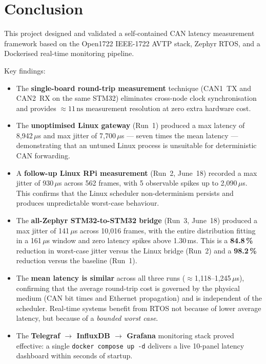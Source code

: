 \documentclass[11pt,a4paper]{article}
\begin{document}
\section{Conclusion}
\label{sec:conclusion}

This project designed and validated a self-contained CAN latency measurement framework
based on the Open1722 IEEE-1722 AVTP stack, Zephyr RTOS, and a Dockerised real-time
monitoring pipeline.

Key findings:

\begin{itemize}
    \item The \textbf{single-board round-trip measurement} technique (CAN1~TX and
          CAN2~RX on the same STM32) eliminates cross-node clock synchronisation
          and provides $\approx 11\,\text{ns}$ measurement resolution at zero extra
          hardware cost.

    \item The \textbf{unoptimised Linux gateway} (Run~1) produced a max latency of
          8{,}942\,$\mu$s and max jitter of 7{,}700\,$\mu$s --- seven times the mean
          latency --- demonstrating that an untuned Linux process is unsuitable for
          deterministic CAN forwarding.

    \item A \textbf{follow-up Linux RPi measurement} (Run~2, June~18) recorded a max
          jitter of 930\,$\mu$s across 562 frames, with 5 observable spikes up to
          2{,}090\,$\mu$s.  This confirms that the Linux scheduler non-determinism
          persists and produces unpredictable worst-case behaviour.

    \item The \textbf{all-Zephyr STM32-to-STM32 bridge} (Run~3, June~18) produced a
          max jitter of 141\,$\mu$s across 10{,}016 frames, with the entire distribution
          fitting in a 161\,$\mu$s window and zero latency spikes above 1.30\,ms.  This
          is a \textbf{84.8\,\%} reduction in worst-case jitter versus the Linux bridge
          (Run~2) and a \textbf{98.2\,\%} reduction versus the baseline (Run~1).

    \item The \textbf{mean latency is similar} across all three runs ($\approx$1{,}118--1{,}245\,$\mu$s),
          confirming that the average round-trip cost is governed by the physical medium
          (CAN bit times and Ethernet propagation) and is independent of the scheduler.
          Real-time systems benefit from RTOS not because of lower average latency, but
          because of a \emph{bounded worst case}.

    \item The \textbf{Telegraf $\rightarrow$ InfluxDB $\rightarrow$ Grafana} monitoring
          stack proved effective: a single \texttt{docker compose up -d} delivers a
          live 10-panel latency dashboard within seconds of startup.
\end{itemize}
\end{document}
